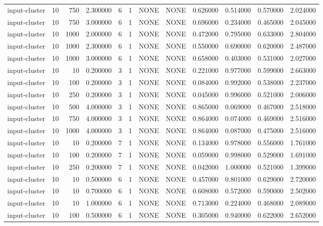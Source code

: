 \begin{tabular}{lrrrllllrrrr}
input-cluster & 10 & 750 & 2.300000 & 6 & 1 & NONE & NONE & 0.626000 & 0.514000 & 0.570000 & 2.024000 \\
input-cluster & 10 & 750 & 3.000000 & 6 & 1 & NONE & NONE & 0.696000 & 0.234000 & 0.465000 & 2.045000 \\
input-cluster & 10 & 1000 & 2.000000 & 6 & 1 & NONE & NONE & 0.472000 & 0.795000 & 0.633000 & 2.804000 \\
input-cluster & 10 & 1000 & 2.300000 & 6 & 1 & NONE & NONE & 0.550000 & 0.690000 & 0.620000 & 2.487000 \\
input-cluster & 10 & 1000 & 3.000000 & 6 & 1 & NONE & NONE & 0.658000 & 0.403000 & 0.531000 & 2.027000 \\
input-cluster & 10 & 10 & 0.200000 & 3 & 1 & NONE & NONE & 0.221000 & 0.977000 & 0.599000 & 2.663000 \\
input-cluster & 10 & 100 & 0.200000 & 3 & 1 & NONE & NONE & 0.084000 & 0.992000 & 0.538000 & 2.237000 \\
input-cluster & 10 & 250 & 0.200000 & 3 & 1 & NONE & NONE & 0.045000 & 0.996000 & 0.521000 & 2.006000 \\
input-cluster & 10 & 500 & 4.000000 & 3 & 1 & NONE & NONE & 0.865000 & 0.069000 & 0.467000 & 2.518000 \\
input-cluster & 10 & 750 & 4.000000 & 3 & 1 & NONE & NONE & 0.864000 & 0.074000 & 0.469000 & 2.516000 \\
input-cluster & 10 & 1000 & 4.000000 & 3 & 1 & NONE & NONE & 0.864000 & 0.087000 & 0.475000 & 2.516000 \\
input-cluster & 10 & 10 & 0.200000 & 7 & 1 & NONE & NONE & 0.134000 & 0.978000 & 0.556000 & 1.761000 \\
input-cluster & 10 & 100 & 0.200000 & 7 & 1 & NONE & NONE & 0.059000 & 0.998000 & 0.529000 & 1.691000 \\
input-cluster & 10 & 250 & 0.200000 & 7 & 1 & NONE & NONE & 0.042000 & 1.000000 & 0.521000 & 1.399000 \\
input-cluster & 10 & 10 & 0.500000 & 6 & 1 & NONE & NONE & 0.457000 & 0.801000 & 0.629000 & 2.720000 \\
input-cluster & 10 & 10 & 0.700000 & 6 & 1 & NONE & NONE & 0.608000 & 0.572000 & 0.590000 & 2.502000 \\
input-cluster & 10 & 10 & 1.000000 & 6 & 1 & NONE & NONE & 0.713000 & 0.224000 & 0.468000 & 2.089000 \\
input-cluster & 10 & 100 & 0.500000 & 6 & 1 & NONE & NONE & 0.305000 & 0.940000 & 0.622000 & 2.652000 \\

\end{tabular}

